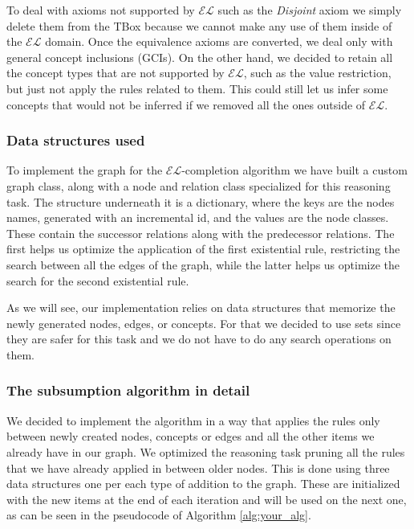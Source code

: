 \documentclass[a4paper]{article}
\theoremstyle{plain}
\theoremstyle{definition}
\begin{document}
    To deal with axioms not supported by $\mathcal{EL}$ such as the \textit{Disjoint} axiom we simply delete them from the TBox because we cannot make any use of them inside of the $\mathcal{EL}$ domain. Once the equivalence axioms are converted, we deal only with general concept inclusions (GCIs).
    On the other hand, we decided to retain all the concept types that are not supported by $\mathcal{EL}$, such as the value restriction, but just not apply the rules related to them. This could still let us infer some concepts that would not be inferred if we removed all the ones outside of $\mathcal{EL}$.

    \subsubsection{Data structures used}

    To implement the graph for the $\mathcal{EL}$-completion algorithm we have built a custom graph class, along with a node and relation class specialized for this reasoning task. The structure underneath it is a dictionary, where the keys are the nodes names, generated with an incremental id, and the values are the node classes. These contain the successor relations along with the predecessor relations. The first helps us optimize the application of the first existential rule, restricting the search between all the edges of the graph,  while the latter helps us optimize the search for the second existential rule.

    As we will see, our implementation relies on data structures that memorize the newly generated nodes, edges, or concepts. For that we decided to use sets since they are safer for this task and we do not have to do any search operations on them.

    \subsubsection{The subsumption algorithm in detail}
    We decided to implement the algorithm in a way that applies the rules only between newly created nodes, concepts or edges and all the other items we already have in our graph. We optimized the reasoning task pruning all the rules that we have already applied in between older nodes.
    This is done using three data structures one per each type of addition to the graph. These are initialized with the new items at the end of each iteration and will be used on the next one, as can be seen in the pseudocode of Algorithm \ref{alg:your_alg}.
\end{document}
